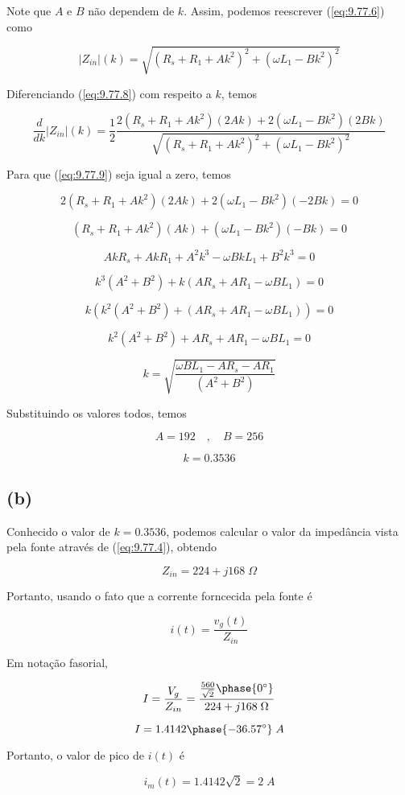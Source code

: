 Note que  \(A\) e \(B\) não dependem de \(k\). Assim, podemos reescrever (\ref{eq:9.77.6}) como

\begin{equation}\label{eq:9.77.8}
    |Z_{in}|(k) = \sqrt{\left(R_s + R_1 + A k^2\right)^2 + \left(\omega L_1 - B k^2\right)^2}
\end{equation}

Diferenciando (\ref{eq:9.77.8}) com respeito a \(k\), temos

\begin{equation}\label{eq:9.77.9}
    \frac{d}{dk}|Z_{in}|(k) = \frac{1}{2}\frac{2(R_s + R_1 + A k^2)(2Ak) + 2(\omega L_1 - B k^2)(2Bk)}{\sqrt{\left(R_s + R_1 + A k^2\right)^2 + \left(\omega L_1 - B k^2\right)^2}}
\end{equation}

Para que (\ref{eq:9.77.9}) seja igual a zero, temos

\[ 2(R_s + R_1 + A k^2)(2Ak) + 2(\omega L_1 - B k^2)(-2Bk) = 0 \]

\[ (R_s + R_1 + A k^2)(Ak) + (\omega L_1 - B k^2)(-Bk) = 0 \]

\[ AkR_s + AkR_1 + A^2k^3 - \omega BkL_1 + B^2k^3 = 0 \]

\[ k^3(A^2+B^2) + k(AR_s + AR_1 - \omega BL_1) = 0 \]

\[ k\left(k^2(A^2+B^2) + (AR_s + AR_1 - \omega BL_1)\right) = 0 \]

\[ k^2(A^2+B^2) + AR_s + AR_1 - \omega BL_1 = 0 \]

\[ k = \sqrt{\frac{\omega BL_1 - AR_s - AR_1 }{(A^2+B^2)}} \]

Substituindo os valores todos, temos

\[ A = 192 \quad , \quad B = 256 \]

\[ \boxed{k = 0.3536} \]

\subsection*{(b)}

Conhecido o valor de \(k = 0.3536\), podemos calcular o valor da impedância vista pela fonte através de (\ref{eq:9.77.4}), obtendo

\[ Z_{in} = 224 + j168 \; \Omega \]

Portanto, usando o fato que a corrente forncecida pela fonte é

\[ i(t) = \frac{v_g(t)}{Z_{in}} \]

Em notação fasorial,

\[ I = \frac{V_g}{Z_{in}} = \frac{\frac{560}{\sqrt{2}}\phase{0^{\circ}}}{224 + j168 \; \Omega} \]

\[ I = 1.4142\phase{-36.57^{\circ}} \; A \]

Portanto, o valor de pico de \(i(t)\) é

\[ \boxed{i_m(t) = 1.4142 \sqrt{2} = 2 \; A}  \]
